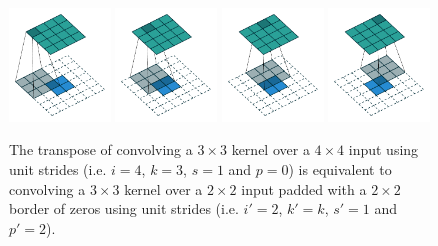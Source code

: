 \documentclass{report}
\begin{document}
\begin{figure}[p]
    \centering
    \includegraphics[width=0.24\textwidth]{pdf/no_padding_no_strides_transposed_00.pdf}
    \includegraphics[width=0.24\textwidth]{pdf/no_padding_no_strides_transposed_01.pdf}
    \includegraphics[width=0.24\textwidth]{pdf/no_padding_no_strides_transposed_02.pdf}
    \includegraphics[width=0.24\textwidth]{pdf/no_padding_no_strides_transposed_03.pdf}
    \caption{\label{fig:no_padding_no_strides_transposed} The transpose of
        convolving a $3 \times 3$ kernel over a $4 \times 4$ input using unit
        strides (i.e. $i = 4$, $k = 3$, $s = 1$ and $p = 0$) is equivalent to
        convolving a $3 \times 3$ kernel over a $2 \times 2$ input padded with
        a $2 \times 2$ border of zeros using unit strides (i.e. $i' = 2$, $k' =
        k$, $s' = 1$ and $p' = 2$).}
\end{figure}
\end{document}
